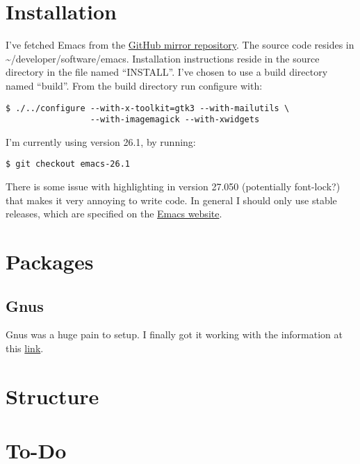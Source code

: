 \documentclass{default}
\begin{document}
\tableofcontents
\hypersetup{linkcolor=red}

\chapter{Installation}\label{cha:installation}

I've fetched Emacs from the \href{https://github.com/emacs-mirror/emacs}{GitHub mirror
  repository}. The source code resides in \textasciitilde/developer/software/emacs. Installation
instructions reside in the source directory in the file named ``INSTALL''. I've chosen to use a
build directory named ``build''. From the build directory run configure with:

\begin{verbatim}
$ ./../configure --with-x-toolkit=gtk3 --with-mailutils \
                 --with-imagemagick --with-xwidgets
\end{verbatim}

I'm currently using version 26.1, by running:

\begin{verbatim}
$ git checkout emacs-26.1
\end{verbatim}

There is some issue with highlighting in version 27.050 (potentially font-lock?) that makes it very
annoying to write code. In general I should only use stable releases, which are specified on the
\href{https://www.gnu.org/software/emacs/}{Emacs website}.

\chapter{Packages}\label{cha:packages}

\section{Gnus}
\label{sec:gnus}

Gnus was a huge pain to setup. I finally got it working with the information at this
\href{https://eschulte.github.io/emacs-starter-kit/starter-kit-gnus-imap.html}{link}.

\chapter{Structure}\label{cha:structure}


\chapter{To-Do}\label{cha:to-do}
\end{document}
